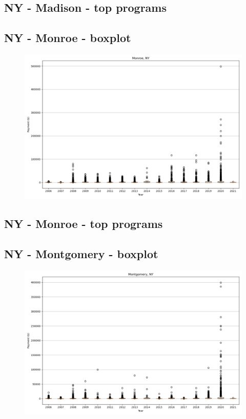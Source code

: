 \subsection*{NY - Madison - top programs}

\newpage
\subsection*{NY - Monroe - boxplot}
\begin{figure}[h]
\centering
\includegraphics[width=7in]{../output/boxplots/counties/Monroe-NY_boxplot.png}
\end{figure}


\subsection*{NY - Monroe - top programs}

\newpage
\subsection*{NY - Montgomery - boxplot}
\begin{figure}[h]
\centering
\includegraphics[width=7in]{../output/boxplots/counties/Montgomery-NY_boxplot.png}
\end{figure}


